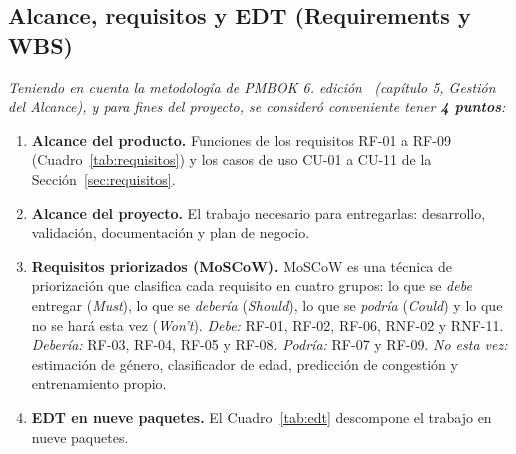 \documentclass[12pt,a4paper]{article}
\begin{document}
\subsection{Alcance, requisitos y EDT (Requirements y WBS)}
\label{sec:alcance}

\textit{Teniendo en cuenta la metodología de PMBOK 6.\textordfeminine{} edición~\cite{pmbok6}
(capítulo 5, Gestión del Alcance), y para fines del proyecto, se consideró
conveniente tener \textbf{4 puntos}:}

\begin{enumerate}
    \item \textbf{Alcance del producto.} Funciones de los requisitos RF-01 a
    RF-09 (Cuadro~\ref{tab:requisitos}) y los casos de uso CU-01 a CU-11 de la
    Sección~\ref{sec:requisitos}.

    \item \textbf{Alcance del proyecto.} El trabajo necesario para
    entregarlas: desarrollo, validación, documentación y plan de negocio.

    \item \textbf{Requisitos priorizados (MoSCoW).} MoSCoW es una técnica de
    priorización que clasifica cada requisito en cuatro grupos: lo que se
    \textit{debe} entregar (\textit{Must}), lo que se \textit{debería}
    (\textit{Should}), lo que se \textit{podría} (\textit{Could}) y lo que no se
    hará esta vez (\textit{Won't}). \textit{Debe:} RF-01,
    RF-02, RF-06, RNF-02 y RNF-11. \textit{Debería:} RF-03, RF-04, RF-05 y
    RF-08. \textit{Podría:} RF-07 y RF-09. \textit{No esta vez:} estimación de género, clasificador de edad, predicción de congestión y
    entrenamiento propio.

    \item \textbf{EDT en nueve paquetes.} El Cuadro~\ref{tab:edt} descompone el
    trabajo en nueve paquetes.
\end{enumerate}
\end{document}
